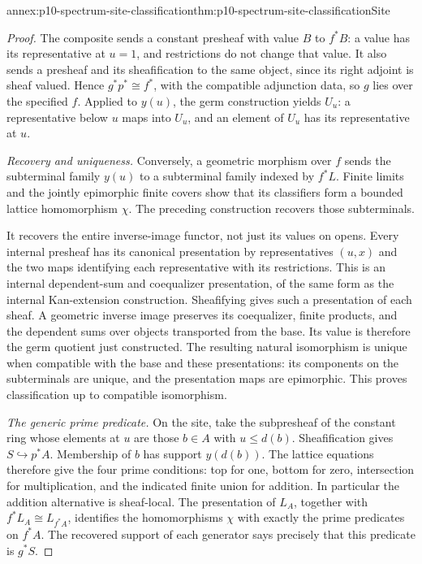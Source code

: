 \begin{annexitem}{annex:p10-spectrum-site-classification}{thm:p10-spectrum-site-classification}{Site}
\begin{proof}
The composite sends a constant presheaf with value \(B\)
to \(f^*B\): a value has its representative at \(u=1\),
and restrictions do not change that value.
It also sends a presheaf and its sheafification to the
same object, since its right adjoint is sheaf valued.
Hence \(g^*p^*\cong f^*\), with the compatible adjunction
data, so \(g\) lies over the specified \(f\).
Applied to \(y(u)\), the germ construction yields \(U_u\):
a representative below \(u\) maps into \(U_u\), and an
element of \(U_u\) has its representative at \(u\).

\emph{Recovery and uniqueness.}
Conversely, a geometric morphism over \(f\) sends the
subterminal family \(y(u)\) to a subterminal family indexed
by \(f^*L\). Finite limits and the jointly epimorphic finite
covers show that its classifiers form a bounded lattice
homomorphism \(\chi\).
The preceding construction recovers those subterminals.

It recovers the entire inverse-image functor, not just its
values on opens. Every internal presheaf has its canonical
presentation by representatives \((u,x)\) and the two maps
identifying each representative with its restrictions.
This is an internal dependent-sum and coequalizer
presentation, of the same form as the internal Kan-extension
construction. Sheafifying gives such a presentation of each
sheaf. A geometric inverse image preserves its coequalizer,
finite products, and the dependent sums over objects
transported from the base. Its value is therefore the
germ quotient just constructed.
The resulting natural isomorphism is unique when compatible
with the base and these presentations: its components on
the subterminals are unique, and the presentation maps are
epimorphic. This proves classification up to compatible
isomorphism.

\emph{The generic prime predicate.}
On the site, take the subpresheaf of the constant ring
whose elements at \(u\) are those \(b\in A\) with \(u\leq d(b)\).
Sheafification gives \(S\hookrightarrow p^*A\).
Membership of \(b\) has support \(y(d(b))\).
The lattice equations therefore give the four prime
conditions: top for one, bottom for zero, intersection for
multiplication, and the indicated finite union for addition.
In particular the addition alternative is sheaf-local.
The presentation of \(L_A\), together with
\(f^*L_A\cong L_{f^*A}\), identifies the homomorphisms \(\chi\)
with exactly the prime predicates on \(f^*A\).
The recovered support of each generator says precisely that
this predicate is \(g^*S\).
\end{proof}
\end{annexitem}

